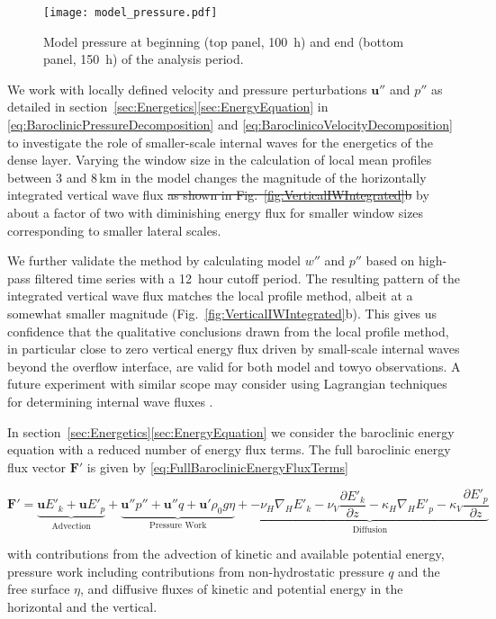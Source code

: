 \documentclass{ametsocV6.1}
\providecommand{\DIFdel}[1]{{\protect\color{red}\sout{#1}}}                      %
\providecommand{\DIFdelbegin}{} %
\providecommand{\DIFdelend}{} %
\begin{document}
\begin{figure}
\centerline{\texttt{[image: model\_pressure.pdf]}}
\caption{Model pressure at beginning (top panel, 100~h) and end (bottom panel, 150~h) of the analysis period.}
\label{fig:ModelPressureComponents}
\end{figure}


\appendix[B]
We work with locally defined velocity and pressure perturbations $\mathbf{u''}$ and $p''$ as detailed in section~\ref{sec:Energetics}\ref{sec:EnergyEquation} in \eqref{eq:BaroclinicPressureDecomposition} and \eqref{eq:BaroclinicoVelocityDecomposition} to investigate the role of smaller-scale internal waves for the energetics of the dense layer.
Varying the window size in the calculation of local mean profiles between 3 and 8\,km in the model changes the magnitude of the horizontally integrated vertical wave flux \DIFdelbegin \DIFdel{as shown in Fig.~\ref{fig:VerticalIWIntegrated}b }\DIFdelend by about a factor of two with diminishing energy flux for smaller window sizes corresponding to smaller lateral scales.

We further validate the method by calculating model $w''$ and $p''$ based on high-pass filtered time series with a 12~hour cutoff period.
The resulting pattern of the integrated vertical wave flux matches the local profile method, albeit at a somewhat smaller magnitude (Fig.~\ref{fig:VerticalIWIntegrated}b).
This gives us confidence that the qualitative conclusions drawn from the local profile method, in particular close to zero vertical energy flux driven by small-scale internal waves beyond the overflow interface, are valid for both model and towyo observations.
A future experiment with similar scope may consider using Lagrangian techniques for determining internal wave fluxes \citep[e.g.][]{shakespearehogg18, bachmanetal20}.


\appendix[C]
In section~\ref{sec:Energetics}\ref{sec:EnergyEquation} we consider the baroclinic energy equation with a reduced number of energy flux terms. The full baroclinic energy flux vector $\mathbf{F'}$ is given by \eqref{eq:FullBaroclinicEnergyFluxTerms}
\begin{table*}[h!t]
\begin{equation}
\mathbf{F'} = \underbrace{\mathbf{u}E'_k + \mathbf{u}E'_p}_\text{Advection} + \underbrace{\mathbf{u''}p'' + \mathbf{u''}q + \mathbf{u'}\rho_0 g \eta }_\text{Pressure Work} + \underbrace{-\nu_H \nabla_H E'_k -\nu_V \frac{\partial E'_k}{\partial z} - \kappa_H \nabla_H E'_p -\kappa_V \frac{\partial E'_p}{\partial z} }_\text{Diffusion} 
\label{eq:FullBaroclinicEnergyFluxTerms}
\end{equation}
\end{table*}
with contributions from the advection of kinetic and available potential energy, pressure work including contributions from non-hydrostatic pressure $q$ and the free surface $\eta$, and diffusive fluxes of kinetic and potential energy in the horizontal and the vertical.
\end{document}
